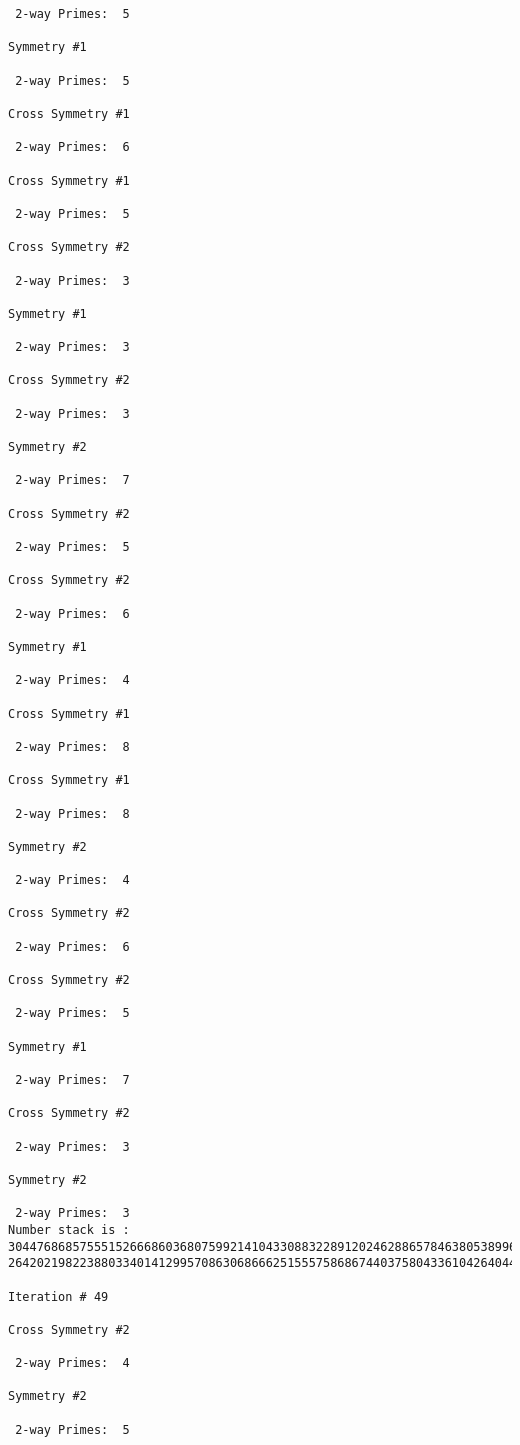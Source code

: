 \begin{verbatim}
 2-way Primes: 	5

Symmetry #1

 2-way Primes: 	5

Cross Symmetry #1

 2-way Primes: 	6

Cross Symmetry #1

 2-way Primes: 	5

Cross Symmetry #2

 2-way Primes: 	3

Symmetry #1

 2-way Primes: 	3

Cross Symmetry #2

 2-way Primes: 	3

Symmetry #2

 2-way Primes: 	7

Cross Symmetry #2

 2-way Primes: 	5

Cross Symmetry #2

 2-way Primes: 	6

Symmetry #1

 2-way Primes: 	4

Cross Symmetry #1

 2-way Primes: 	8

Cross Symmetry #1

 2-way Primes: 	8

Symmetry #2

 2-way Primes: 	4

Cross Symmetry #2

 2-way Primes: 	6

Cross Symmetry #2

 2-way Primes: 	5

Symmetry #1

 2-way Primes: 	7

Cross Symmetry #2

 2-way Primes: 	3

Symmetry #2

 2-way Primes: 	3
Number stack is :
30447686857555152666860368075992141043308832289120246288657846380538996794608835958544046240163340857
26420219822388033401412995708630686662515557586867440375804336104264044585953880649769983508364875688

Iteration #	49

Cross Symmetry #2

 2-way Primes: 	4

Symmetry #2

 2-way Primes: 	5


\end{verbatim}

